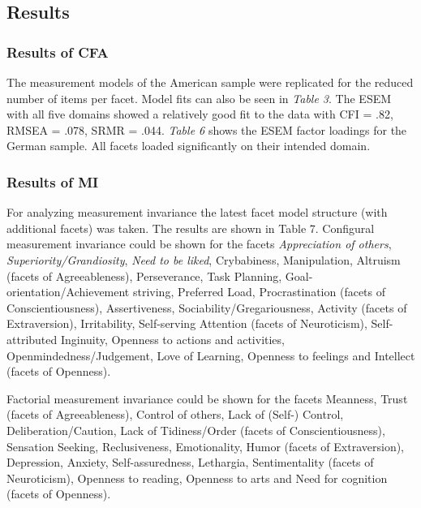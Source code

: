\documentclass[,man,floatsintext]{apa6}
\begin{document}
\subsection{Results}\label{results-1}

\subsubsection{Results of CFA}\label{results-of-cfa}

The measurement models of the American sample were replicated for the
reduced number of items per facet. Model fits can also be seen in
\emph{Table 3}. The ESEM with all five domains showed a relatively good
fit to the data with CFI = .82, RMSEA = .078, SRMR = .044. \emph{Table
6} shows the ESEM factor loadings for the German sample. All facets
loaded significantly on their intended domain.

\vspace{5mm}

\vspace{5mm}

\subsubsection{Results of MI}\label{results-of-mi}

For analyzing measurement invariance the latest facet model structure
(with additional facets) was taken. The results are shown in Table 7.
Configural measurement invariance could be shown for the facets
\emph{Appreciation of others}, \emph{Superiority/Grandiosity},
\emph{Need to be liked}, Crybabiness, Manipulation, Altruism (facets of
Agreeableness), Perseverance, Task Planning,
Goal-orientation/Achievement striving, Preferred Load, Procrastination
(facets of Conscientiousness), Assertiveness,
Sociability/Gregariousness, Activity (facets of Extraversion),
Irritability, Self-serving Attention (facets of Neuroticism),
Self-attributed Inginuity, Openness to actions and activities,
Openmindedness/Judgement, Love of Learning, Openness to feelings and
Intellect (facets of Openness).

Factorial measurement invariance could be shown for the facets Meanness,
Trust (facets of Agreeableness), Control of others, Lack of (Self-)
Control, Deliberation/Caution, Lack of Tidiness/Order (facets of
Conscientiousness), Sensation Seeking, Reclusiveness, Emotionality,
Humor (facets of Extraversion), Depression, Anxiety, Self-assuredness,
Lethargia, Sentimentality (facets of Neuroticism), Openness to reading,
Openness to arts and Need for cognition (facets of Openness).
\end{document}
